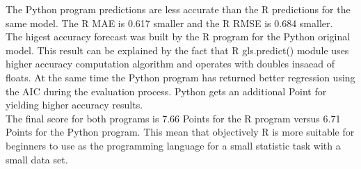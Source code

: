 \documentclass [twoside,
  11pt, a4paper,
  footinclude=true,
  headinclude=true,
  cleardoublepage=empty
]{article}
\begin{document}
The Python program predictions are less accurate than the R predictions for the same model. The R MAE is 0.617 smaller and the R RMSE is 0.684 smaller.\\
The higest accuracy forecast was built by the R program for the Python original model. This result can be explained by the fact that R gls.predict() module uses higher accuracy computation algorithm and operates with doubles insaead of floats. At the same time the Python program has returned better regression using the AIC during the evaluation process. Python gets an additional Point for yielding higher accuracy results.\\
The final score for both programs is 7.66 Points for the R program versus 6.71 Points for the Python program. This mean that objectively R is more suitable for beginners to use as the programming language for a small statistic task with a small data set.
\end{document}
